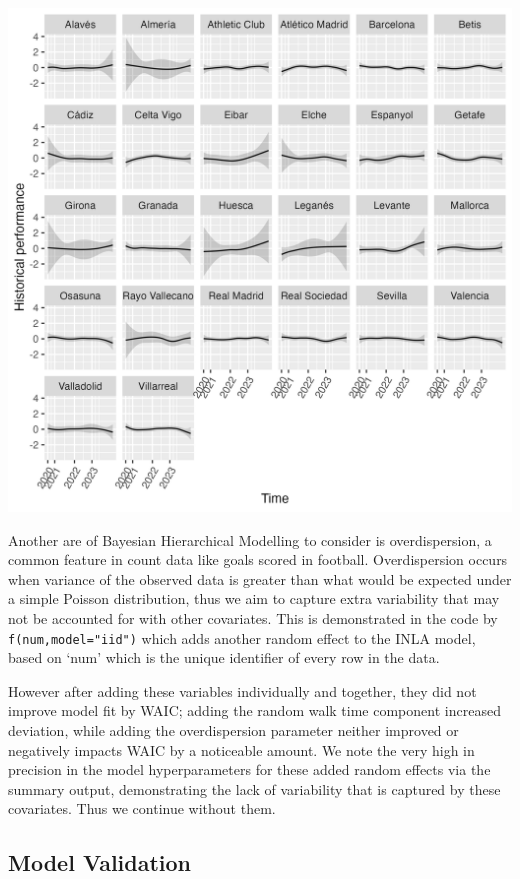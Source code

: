 \documentclass[
]{article}
\begin{document}
\includegraphics[width=25in]{LaligaTTplot}

Another are of Bayesian Hierarchical Modelling to consider is
overdispersion, a common feature in count data like goals scored in
football. Overdispersion occurs when variance of the observed data is
greater than what would be expected under a simple Poisson distribution,
thus we aim to capture extra variability that may not be accounted for
with other covariates. This is demonstrated in the code by
\texttt{f(num,model="iid")} which adds another random effect to the INLA
model, based on `num' which is the unique identifier of every row in the
data.

However after adding these variables individually and together, they did
not improve model fit by WAIC; adding the random walk time component
increased deviation, while adding the overdispersion parameter neither
improved or negatively impacts WAIC by a noticeable amount. We note the
very high in precision in the model hyperparameters for these added
random effects via the summary output, demonstrating the lack of
variability that is captured by these covariates. Thus we continue
without them.

\hypertarget{model-validation}{%
\subsection{Model Validation}\label{model-validation}}
\end{document}
